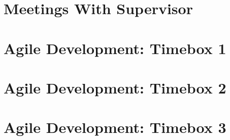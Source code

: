 \documentclass[preprint,12pt,review,authoryear]{elsarticle}
\begin{document}
\section{Meetings With Supervisor}
\renewcommand{\thepage}{K\arabic{page}}
\newpage

\section{Agile Development: Timebox 1}
\renewcommand{\thepage}{L\arabic{page}}
\newpage
\section{Agile Development: Timebox 2}
\renewcommand{\thepage}{M\arabic{page}}
\newpage
\section{Agile Development: Timebox 3}
\renewcommand{\thepage}{N\arabic{page}}
\newpage
\end{document}
